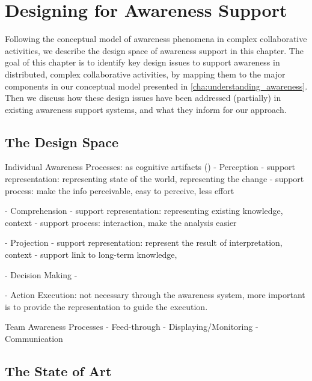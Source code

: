 \graphicspath{{Figures/}}

\chapter{Designing for Awareness Support} %
\label{cha:designing_for_awareness_support}
Following the conceptual model of awareness phenomena in complex collaborative activities, we describe the design space of awareness support in this chapter. The goal of this chapter is to identify key design issues to support awareness in distributed, complex collaborative activities, by mapping them to the major components in our conceptual model presented in \ref{cha:understanding_awareness}. Then we discuss how these design issues have been addressed (partially) in existing awareness support systems, and what they inform for our approach. 

\section{The Design Space} %
\label{sec:the_design_space}

Individual Awareness Processes: as cognitive artifacts (\cite{springerlink:10.1007/BF02032391})
 - Perception
  - support representation: representing state of the world, representing the change
  - support process: make the info perceivable, easy to perceive, less effort

 - Comprehension
  - support representation: representing existing knowledge, context
  - support process: interaction, make the analysis easier 	

 - Projection
  - support representation: represent the result of interpretation, context
  - support link to long-term knowledge, 

 - Decision Making
  - 
  
 - Action Execution: not necessary through the awareness system, more important is to provide the representation to guide the execution.


Team Awareness Processes
 - Feed-through
 - Displaying/Monitoring
 - Communication




\section{The State of Art} %
\label{sec:the_state_of_art}


